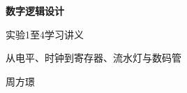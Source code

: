 \documentclass[UTF8,fontset=fandol,zihao=-4,a4paper]{ctexart}
\begin{document}
\begin{titlepage}
\thispagestyle{fancy}
\vspace*{20mm}
{\Huge\bfseries\color{ink}数字逻辑设计}\par\vspace{5mm}
{\LARGE 实验1至4学习讲义}\par\vspace{10mm}
{\large 从电平、时钟到寄存器、流水灯与数码管}\par\vspace{13mm}
周方璟\par
\vspace{12mm}
\end{titlepage}
\setcounter{page}{2}
{\small\tableofcontents}
\clearpage








\end{document}
